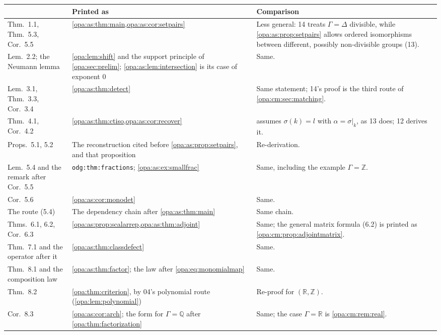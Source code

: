 \documentclass[11pt,oneside]{article}
\numberwithin{equation}{section}
\theoremstyle{definition}
\theoremstyle{remark}
\newcommand{\R}{\mathbb R}
\newcommand{\Q}{\mathbb Q}
\newcommand{\Z}{\mathbb Z}
\newcommand{\lbl}[1]{\nolinkurl{#1}}
\begin{document}
\begin{center}
\renewcommand{\arraystretch}{1.15}
\begin{longtable}{>{\raggedright\arraybackslash}p{}>{\raggedright\arraybackslash}p{}>{\raggedright\arraybackslash}p{}}
\toprule
14 & Printed as & Comparison\\
\midrule
\endhead
Thm.~1.1, Thm.~5.3, Cor.~5.5 & \cref{opa:as:thm:main,opa:as:cor:setpairs} & Less general: 14 treats
$\Gamma=\Delta$ divisible, while \cref{opa:as:prop:setpairs} allows ordered isomorphisms
between different, possibly non-divisible groups (13).\\
Lem.~2.2; the Neumann lemma & \cref{opa:lem:shift} and the support principle of
\cref{opa:sec:prelim}; \cref{opa:as:lem:intersection} is its case of exponent $0$ & Same.\\
Lem.~3.1, Thm.~3.3, Cor.~3.4 & \cref{opa:as:thm:detect} & Same statement; 14's proof is the third
route of \cref{opa:cm:sec:matching}.\\
Thm.~4.1, Cor.~4.2 & \cref{opa:as:thm:ctiso,opa:as:cor:recover} & 14 assumes $\sigma(k)=l$ with
$\alpha=\sigma|_k$, as 13 does; 12 derives it.\\
Props.~5.1, 5.2 & The reconstruction cited before \cref{opa:as:prop:setpairs}, and that
proposition & Re-derivation.\\
Lem.~5.4 and the remark after Cor.~5.5 & \lbl{odg:thm:fractions};
\cref{opa:as:ex:smallfrac} & Same, including the example $\Gamma=\Z$.\\
Cor.~5.6 & \cref{opa:as:cor:monodet} & Same.\\
The route (5.4) & The dependency chain after \cref{opa:as:thm:main} & Same chain.\\
Thms.~6.1, 6.2, Cor.~6.3 & \cref{opa:as:prop:scalarrep,opa:as:thm:adjoint} & Same; the general
matrix formula (6.2) is printed as \cref{opa:cm:prop:adjointmatrix}.\\
Thm.~7.1 and the operator after it & \cref{opa:as:thm:classdefect} & Same.\\
Thm.~8.1 and the composition law & \cref{opa:as:thm:factor}; the law after
\eqref{opa:eq:monomialmap} & Same.\\
Thm.~8.2 & \cref{opa:thm:criterion}, by 04's polynomial route (\cref{opa:lem:polynomial}) & Re-proof
for $(\R,\Z)$.\\
Cor.~8.3 & \cref{opa:as:cor:arch}; the form for $\Gamma=\Q$ after \cref{opa:thm:factorization} &
Same; the case $\Gamma=\R$ is \cref{opa:cm:rem:real}.\\

\end{longtable}
\end{center}
\end{document}

